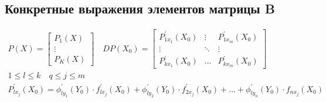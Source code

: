 \documentclass[main]{subfiles}
\begin{document}
    \subsection*{Конкретные выражения элементов матрицы B} 
    \begin{gather*}
        P(X) = \begin{bmatrix*}
            P_1(X) \\
            \vdots \\
            P_K(X) 
        \end{bmatrix*} \quad DP(X_0) = \begin{bmatrix*}
            P_{1x_1}^\prime(X_0) & \vdots & P_{1x_m}^\prime(X_0) \\
            \vdots & \ddots & \vdots \\
            P_{kx_1}^\prime(X_0) & \ldots & P_{kx_m}^\prime(X_0)
        \end{bmatrix*} \\
        1 \leq l \leq k \quad q \leq j \leq m \\
        P^\prime_{lx_j}(X_0) = \phi^\prime_{ly_1}(Y_0) \cdot f^\prime_{lx_j}(X_0) + \phi^\prime_{ly_2}(Y_0) \cdot f^\prime_{2x_j}(X_0) + \ldots +
        \phi^\prime_{ly_n} (Y_0) \cdot f_{nx_j}(X_0)
    \end{gather*}
\end{document}
